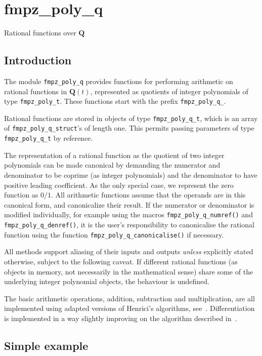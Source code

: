 \documentclass[a4paper,10pt]{book}
\newcommand{\Q}{\mathbf{Q}}%
\newcommand{\code}{\lstinline}
\begin{document}
{{\chapter{fmpz\_poly\_q}
\epigraph{Rational functions over $\Q$}{}

\section{Introduction}

The module \code{fmpz_poly_q} provides functions for performing
arithmetic on rational functions in $\mathbf{Q}(t)$, represented as
quotients of integer polynomials of type \code{fmpz_poly_t}.  These
functions start with the prefix \code{fmpz_poly_q_}.

Rational functions are stored in objects of type \code{fmpz_poly_q_t},
which is an array of \code{fmpz_poly_q_struct}'s of length one.  This
permits passing parameters of type \code{fmpz_poly_q_t} by reference.

The representation of a rational function as the quotient of two integer
polynomials can be made canonical by demanding the numerator and
denominator to be coprime (as integer polynomials) and the denominator to
have positive leading coefficient.  As the only special case, we represent
the zero function as $0/1$.  All arithmetic functions assume that the
operands are in this canonical form, and canonicalize their result.  If the
numerator or denominator is modified individually, for example using the
macros \code{fmpz_poly_q_numref()} and \code{fmpz_poly_q_denref()},
it is the user's responsibility to canonicalise the rational function
using the function \code{fmpz_poly_q_canonicalise()} if necessary.

All methods support aliasing of their inputs and outputs \emph{unless}
explicitly stated otherwise, subject to the following caveat.  If
different rational functions (as objects in memory, not necessarily in the
mathematical sense) share some of the underlying integer polynomial
objects, the behaviour is undefined.

The basic arithmetic operations, addition, subtraction and multiplication,
are all implemented using adapted versions of Henrici's algorithms,
see~\citep{Hen1956}.  Differentiation is implemented in a way slightly
improving on the algorithm described in~\citep{Hor1972}.

\section{Simple example}


}}
\end{document}
